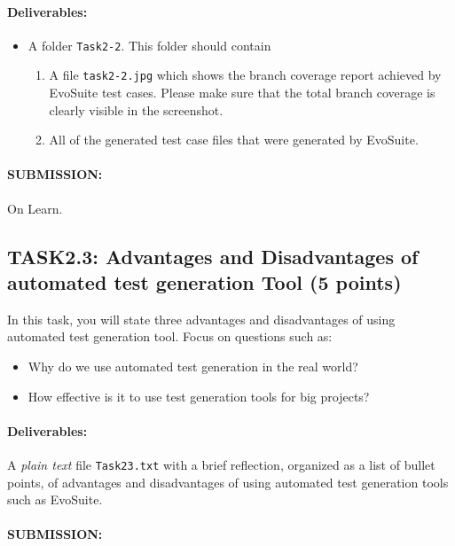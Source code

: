 \documentclass{article}
\begin{document}
\paragraph{Deliverables:}

\begin{itemize}
\item A folder \texttt{Task2-2}. This folder should contain
\begin{enumerate}
\item A file \texttt{task2-2.jpg} which shows the branch coverage
  report achieved by EvoSuite test cases. Please make sure that the
  total branch coverage is clearly visible in the screenshot.
\item All of the generated test case files that were generated by
  EvoSuite.
\end{enumerate}
\end{itemize}

\paragraph{SUBMISSION:}

On Learn.

\subsection{TASK2.3: Advantages and Disadvantages of automated test
  generation Tool (5 points) }

In this task, you will state three advantages and disadvantages of
using automated test generation tool. Focus on questions such as:

\begin{itemize}
\item Why do we use automated test generation in the real world?
\item How effective is it to use test generation tools for big
  projects?
\end{itemize}

\paragraph{Deliverables:}
A \emph{plain text} file \texttt{Task2\textunderscore 3.txt} with a
brief reflection, organized as a list of bullet points, of advantages
and disadvantages of using automated test generation tools such as
EvoSuite.

\paragraph{SUBMISSION:}
\end{document}
